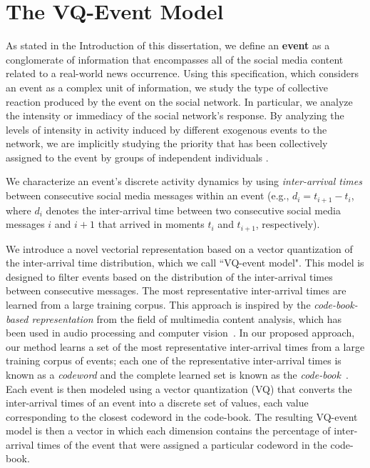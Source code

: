 \section{The VQ-Event Model}
 
As stated in the Introduction of this dissertation, we define an {\bf event} as
a conglomerate of information that encompasses all of the social media content
related to a real-world news occurrence. 
%
Using this specification, which considers an event as a complex unit of
information, we study the type of collective reaction produced by the event on
the social network. 
%
In particular, we analyze the intensity or immediacy of the
social network's response. 
%
By analyzing the levels of intensity in activity induced by different exogenous
events to the network, we are implicitly studying the priority that has been
collectively assigned to the event by groups of independent individuals
\cite{barabasi2005origin, karsai2012universal}. 

We characterize an event's discrete activity dynamics by using
\emph{inter-arrival times} between consecutive social media messages within an
event (e.g., $d_i = t_{i+1}-t_i$, where $d_i$ denotes the inter-arrival time
between two consecutive social media messages $i$ and $i+1$ that arrived in
moments $t_i$ and $t_{i+1}$, respectively).


We introduce a novel vectorial representation based on a vector quantization of
the inter-arrival time distribution, which we call ``VQ-event model". 
%
This model is designed to filter events based on the distribution of the
inter-arrival times between consecutive messages.  
%
The most representative inter-arrival times are learned from a large training
corpus. 
%
This approach is inspired by the {\em code-book-based representation} from the
field of multimedia content analysis, which has been used in audio processing
and computer vision~\cite{ff,Vaizman}.
%
In our proposed approach, our method learns a set of the most representative
inter-arrival times from a large training corpus of events; 
%
each one of the representative inter-arrival times is known as a {\em codeword}
and the complete learned set is known as the {\em code-book}~\cite{Vaizman}. 
%
Each event is then modeled using a vector quantization (VQ) that converts the
inter-arrival times of an event into a discrete set of values, each value
corresponding to the closest codeword in the code-book. 
%
The resulting VQ-event model is then a vector in which each dimension contains
the percentage of inter-arrival times of the event that were assigned a
particular codeword in the code-book.

